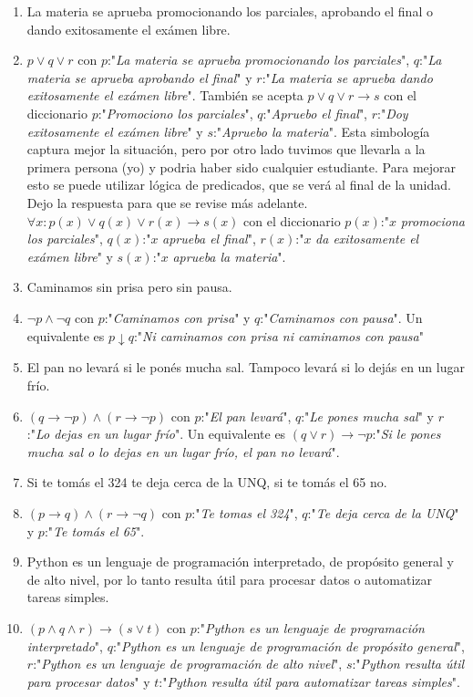 \documentclass[a4paper]{article}
\newcommand{\Item}{\item[\stepcounter{enumii}$\blacktriangleright$\textbf{(\alph{enumii})}]} %
\newcommand{\answer}{\item[**]}
\newcommand{\then}{\to}
\begin{document}
\begin{enumerate}
\begin{multicols}{2}
\begin{enumerate} [label=(\alph*)]
		\item La materia se aprueba promocionando los parciales, aprobando el final o dando exitosamente el exámen libre. 
		\answer $p \lor q \lor r$ con $p$:"\textit{La materia se aprueba promocionando los parciales}", $q$:"\textit{La materia se aprueba aprobando el final}" y $r$:"\textit{La materia se aprueba dando exitosamente el exámen libre}". También se acepta $p \lor q \lor r \then s$ con el diccionario $p$:"\textit{Promociono los parciales}", $q$:"\textit{Apruebo el final}", $r$:"\textit{Doy exitosamente el exámen libre}" y $s$:"\textit{Apruebo la materia}". Esta simbología captura mejor la situación, pero por otro lado tuvimos que llevarla a la primera persona (yo) y podria haber sido cualquier estudiante. Para mejorar esto se puede utilizar lógica de predicados, que se verá al final de la unidad. Dejo la respuesta para que se revise más adelante. $\forall x: p(x) \lor q(x) \lor r(x) \then s(x)$ con el diccionario $p(x)$:"$x$ \textit{promociona los parciales}", $q(x)$:"$x$ \textit{aprueba el final}", $r(x)$:"$x$ \textit{da exitosamente el exámen libre}" y $s(x)$:"$x$ \textit{aprueba la materia}".

		\item Caminamos sin prisa pero sin pausa. 
		\answer $\neg p  \land  \neg q$ con $p$:"\textit{Caminamos con prisa}" y $q$:"\textit{Caminamos con pausa}". Un equivalente es $p \downarrow  q$:"\textit{Ni caminamos con prisa ni caminamos con pausa}"

		\Item El pan no levará si le ponés mucha sal. Tampoco levará si lo dejás en un lugar frío. 
		\answer $(q\then \neg p)  \land  (r\then \neg p)$ con $p$:"\textit{El pan levará}", $q$:"\textit{Le pones mucha sal}" y $r$:"\textit{Lo dejas en un lugar frío}". Un equivalente es $(q \lor r) \then \neg p$:"\textit{Si le pones mucha sal o lo dejas en un lugar frío, el pan no levará}".

		\item Si te tomás el 324 te deja cerca de la UNQ, si te tomás el 65 no. 
		\answer $( p\then q ) \land ( r\then \neg q )$ con $p$:"\textit{Te tomas el 324}", $q$:"\textit{Te deja cerca de la UNQ}" y $p$:"\textit{Te tomás el 65}".  

		\Item Python es un lenguaje de programación interpretado, de propósito general y de alto nivel, por lo tanto resulta útil para procesar datos o automatizar tareas simples. 
		\answer $( p  \land  q  \land  r ) \then  ( s \lor  t )$ con $p$:"\textit{Python es un lenguaje de programación interpretado}", $q$:"\textit{Python es un lenguaje de programación  de propósito general}", $r$:"\textit{Python es un lenguaje de programación de alto nivel}", $s$:"\textit{Python resulta útil para procesar datos}" y $t$:"\textit{Python resulta útil para automatizar tareas simples}".


\end{enumerate}
\end{multicols}
\end{enumerate}
\end{document}
